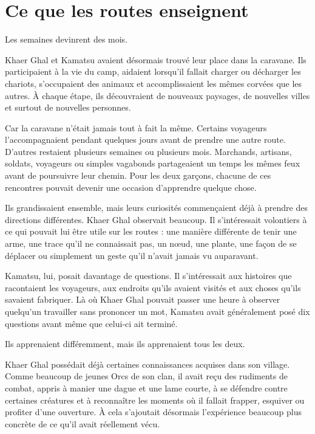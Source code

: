 \chapter{Ce que les routes enseignent}

Les semaines devinrent des mois.

Khaer Ghal et Kamatsu avaient désormais trouvé leur place dans la caravane. Ils
participaient à la vie du camp, aidaient lorsqu'il fallait charger ou décharger
les chariots, s'occupaient des animaux et accomplissaient les mêmes corvées que
les autres. À chaque étape, ils découvraient de nouveaux paysages, de nouvelles
villes et surtout de nouvelles personnes.

Car la caravane n'était jamais tout à fait la même. Certains voyageurs
l'accompagnaient pendant quelques jours avant de prendre une autre route.
D'autres restaient plusieurs semaines ou plusieurs mois. Marchands, artisans,
soldats, voyageurs ou simples vagabonds partageaient un temps les mêmes feux
avant de poursuivre leur chemin. Pour les deux garçons, chacune de ces
rencontres pouvait devenir une occasion d'apprendre quelque chose.

Ils grandissaient ensemble, mais leurs curiosités commençaient déjà à prendre
des directions différentes. Khaer Ghal observait beaucoup. Il s'intéressait
volontiers à ce qui pouvait lui être utile sur les routes : une manière
différente de tenir une arme, une trace qu'il ne connaissait pas, un nœud, une
plante, une façon de se déplacer ou simplement un geste qu'il n'avait jamais
vu auparavant.

Kamatsu, lui, posait davantage de questions. Il s'intéressait aux histoires que
racontaient les voyageurs, aux endroits qu'ils avaient visités et aux choses
qu'ils savaient fabriquer. Là où Khaer Ghal pouvait passer une heure à observer
quelqu'un travailler sans prononcer un mot, Kamatsu avait généralement posé dix
questions avant même que celui-ci ait terminé.

Ils apprenaient différemment, mais ils apprenaient tous les deux.

\scenebreak

Khaer Ghal possédait déjà certaines connaissances acquises dans son village.
Comme beaucoup de jeunes Orcs de son clan, il avait reçu des rudiments de
combat, appris à manier une dague et une lame courte, à se défendre contre
certaines créatures et à reconnaître les moments où il fallait frapper, esquiver
ou profiter d'une ouverture. À cela s'ajoutait désormais l'expérience beaucoup
plus concrète de ce qu'il avait réellement vécu.

